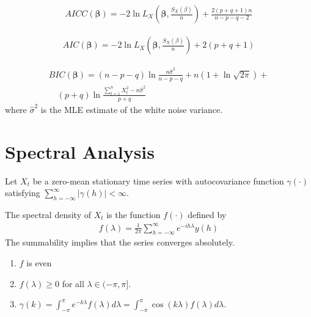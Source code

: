 \begin{thm}
  \label{defn:estimation_arma:12}
  \begin{align}
    \label{eq:68}
    AICC(\mathbf{\beta}) = -2 \ln L_{X}(\mathbf{\beta},
    \frac{S_{X}(\beta)}{n}) + \frac{2(p+q+1)n}{n - p - q - 2}
  \end{align}
\end{thm}

\begin{thm}
  \label{defn:estimation_arma:13}
  \begin{align}
    \label{eq:69}
    AIC(\mathbf{\beta}) = -2 \ln L_{X}(\mathbf{\beta}, \frac{S_{X}(\beta)}{n}) + 2(p + q + 1)
  \end{align}
\end{thm}

\begin{thm}
  \label{defn:estimation_arma:13}
  \begin{align}
    \label{eq:69}
    BIC(\mathbf{\beta}) = (n - p - q) \ln \frac{n \hat
      \sigma^{2}}{n-p-q} + n(1 + \ln \sqrt{2 \pi}) + \\
    \quad (p + q) \ln \frac{\sum_{t=1}^{n} X_{t}^{2} - n \hat
      \sigma^{2}}{p + q}
  \end{align}
  where $\hat \sigma^{2}$ is the MLE estimate of the white noise
  variance.
\end{thm}

\section{Spectral Analysis}
\label{sec:spectral-analysis}

Let $X_{t}$ be a zero-mean stationary time series with autocovariance
function $\gamma(\cdot)$ satisfying $\sum_{h=-\infty}^{\infty}
|\gamma(h)| < \infty$.

\begin{defn}
  \label{defn:spectral_analysis:1}
  The spectral density of $X_{t}$ is the function $f(\cdot)$ defined
  by
  \begin{align}
    \label{eq:47}
    f(\lambda) = \frac{1}{2 \pi} \sum_{h=-\infty}^{\infty}
    e^{-ih\lambda} y(h)
  \end{align}  The summability implies that the series converges
  absolutely.
\end{defn}

\begin{thm}
  \label{defn:spectral_analysis:2}
  \begin{enumerate}
  \item $f$ is even
  \item $f(\lambda) \geq 0$ for all $\lambda \in (-\pi, \pi]$.
  \item $\gamma(k) = \int_{-\pi}^{\pi} e^{-k\lambda} f(\lambda) d
    \lambda = \int_{-\pi}^{\pi} \cos (k \lambda) f(\lambda) d\lambda$.
  \end{enumerate}
\end{thm}

